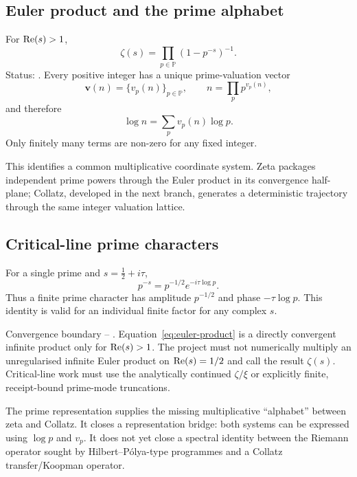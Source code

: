 \subsection{Euler product and the prime alphabet}

For \(\operatorname{Re}(s)>1\),
\begin{equation}
\boxed{\zeta(s)=\prod_{p\in\mathbb P}(1-p^{-s})^{-1}.}
\label{eq:euler-product}
\end{equation}
Status:  \cite{DLMFZetaEuler}. Every positive integer has a unique prime-valuation vector
\begin{equation}
\mathbf v(n)=\{v_p(n)\}_{p\in\mathbb P},
\qquad
n=\prod_p p^{v_p(n)},
\end{equation}
and therefore
\begin{equation}
\boxed{\log n=\sum_p v_p(n)\log p.}
\label{eq:prime-log}
\end{equation}
Only finitely many terms are non-zero for any fixed integer.

This identifies a common multiplicative coordinate system. Zeta packages independent prime powers through the Euler product in its convergence half-plane; Collatz, developed in the next branch, generates a deterministic trajectory through the same integer valuation lattice.

\subsection{Critical-line prime characters}

For a single prime and \(s=\tfrac12+i\tau\),
\begin{equation}
\boxed{p^{-s}=p^{-1/2}e^{-i\tau\log p}.}
\label{eq:prime-critical-character}
\end{equation}
Thus a finite prime character has amplitude \(p^{-1/2}\) and phase \(-\tau\log p\). This identity is valid for an individual finite factor for any complex \(s\).

\begin{claim}{Convergence boundary -- .}
Equation~\eqref{eq:euler-product} is a directly convergent infinite product only for \(\operatorname{Re}(s)>1\). The project must not numerically multiply an unregularised infinite Euler product on \(\operatorname{Re}(s)=1/2\) and call the result \(\zeta(s)\). Critical-line work must use the analytically continued \(\zeta/\xi\) or explicitly finite, receipt-bound prime-mode truncations.
\end{claim}

\INTERP
The prime representation supplies the missing multiplicative ``alphabet'' between zeta and Collatz. It closes a representation bridge: both systems can be expressed using \(\log p\) and \(v_p\). It does not yet close a spectral identity between the Riemann operator sought by Hilbert--P\'olya-type programmes and a Collatz transfer/Koopman operator.
